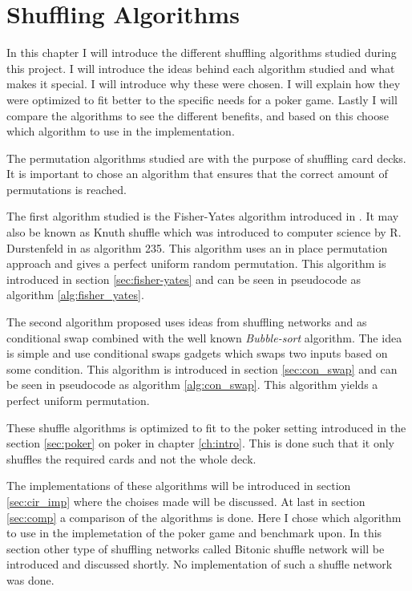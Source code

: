 \documentclass[twoside,11pt,openright]{report}
\begin{document}

\chapter{Shuffling Algorithms}
\label{ch:shuffle}
In this chapter I will introduce the different shuffling algorithms studied during this project. I will introduce the ideas behind each algorithm studied and what makes it special. I will introduce why these were chosen. I will explain how they were optimized to fit better to the specific needs for a poker game. Lastly I will compare the algorithms to see the different benefits, and based on this choose which algorithm to use in the implementation.

The permutation algorithms studied are with the purpose of shuffling card decks. It is important to chose an algorithm that ensures that the correct amount of permutations is reached.

The first algorithm studied is the Fisher-Yates algorithm introduced in . It may also be known as Knuth shuffle which was introduced to computer science by R. Durstenfeld in  as algorithm 235. This algorithm uses an in place permutation approach and gives a perfect uniform random permutation. This algorithm is introduced in section \ref{sec:fisher-yates} and can be seen in pseudocode as algorithm \ref{alg:fisher_yates}.

The second algorithm proposed uses ideas from shuffling networks and  as conditional swap combined with the well known \textit{Bubble-sort} algorithm. The idea is simple and use conditional swaps gadgets which swaps two inputs based on some condition. This algorithm is introduced in section \ref{sec:con_swap} and can be seen in pseudocode as algorithm \ref{alg:con_swap}. This algorithm yields a perfect uniform permutation.

These shuffle algorithms is optimized to fit to the poker setting introduced in the section \ref{sec:poker} on poker in chapter \ref{ch:intro}. This is done such that it only shuffles the required cards and not the whole deck.

The implementations of these algorithms will be introduced in section \ref{sec:cir_imp} where the choises made will be discussed. At last in section \ref{sec:comp} a comparison of the algorithms is done. Here I chose which algorithm to use in the implemetation of the poker game and benchmark upon. In this section other type of shuffling networks called Bitonic shuffle network will be introduced and discussed shortly. No implementation of such a shuffle network was done.
\end{document}
